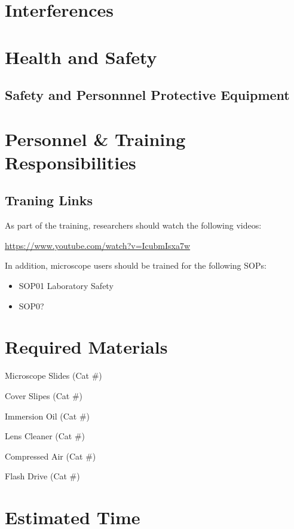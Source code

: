 \documentclass[12pt]{../SOP2}
\begin{document}
\section{Interferences}

\section{Health and Safety}

\subsection*{Safety and Personnnel Protective Equipment}


\section{Personnel \& Training Responsibilities}

\subsection*{Traning Links}

As part of the training, researchers should watch the following videos: 

\href{Useful video}{https://www.youtube.com/watch?v=IcubmIsxa7w}

In addition, microscope users should be trained for the following SOPs:

\begin{itemize}
  \item SOP01 Laboratory Safety
  \item SOP0?
\end{itemize}

\section{Required Materials}

\NP Microscope Slides (Cat \#)

\NP Cover Slipes (Cat \#)

\NP Immersion Oil (Cat \#)

\NP Lens Cleaner (Cat \#)

\NP Compressed Air (Cat \#)

\NP Flash Drive (Cat \#)

\section{Estimated Time}
\end{document}
